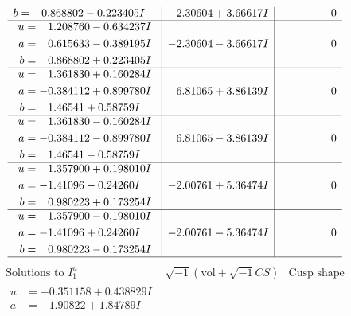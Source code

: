 \documentclass[1p]{elsarticle_modified}
\theoremstyle{definition}
\newcommand{\I}{\sqrt{-1}}
\begin{document}
$$\begin{array}{c|c|c}
\begin{aligned}
b &= \phantom{-}0.868802 - 0.223405 I\end{aligned}
 & -2.30604 + 3.66617 I & \phantom{-0.000000 } 0 \\ \hline\begin{aligned}
u &= \phantom{-}1.208760 - 0.634237 I \\
a &= \phantom{-}0.615633 - 0.389195 I \\
b &= \phantom{-}0.868802 + 0.223405 I\end{aligned}
 & -2.30604 - 3.66617 I & \phantom{-0.000000 } 0 \\ \hline\begin{aligned}
u &= \phantom{-}1.361830 + 0.160284 I \\
a &= -0.384112 + 0.899780 I \\
b &= \phantom{-}1.46541 + 0.58759 I\end{aligned}
 & \phantom{-}6.81065 + 3.86139 I & \phantom{-0.000000 } 0 \\ \hline\begin{aligned}
u &= \phantom{-}1.361830 - 0.160284 I \\
a &= -0.384112 - 0.899780 I \\
b &= \phantom{-}1.46541 - 0.58759 I\end{aligned}
 & \phantom{-}6.81065 - 3.86139 I & \phantom{-0.000000 } 0 \\ \hline\begin{aligned}
u &= \phantom{-}1.357900 + 0.198010 I \\
a &= -1.41096 - 0.24260 I \\
b &= \phantom{-}0.980223 + 0.173254 I\end{aligned}
 & -2.00761 + 5.36474 I & \phantom{-0.000000 } 0 \\ \hline\begin{aligned}
u &= \phantom{-}1.357900 - 0.198010 I \\
a &= -1.41096 + 0.24260 I \\
b &= \phantom{-}0.980223 - 0.173254 I\end{aligned}
 & -2.00761 - 5.36474 I & \phantom{-0.000000 } 0\\
 \hline 
 \end{array}$$\newpage$$\begin{array}{c|c|c}  
\text{Solutions to }I^u_{1}& \I (\text{vol} + \sqrt{-1}CS) & \text{Cusp shape}\\
 \hline 
\begin{aligned}
u &= -0.351158 + 0.438829 I \\
a &= -1.90822 + 1.84789 I \\

\end{aligned}
\end{array}$$
\end{document}
